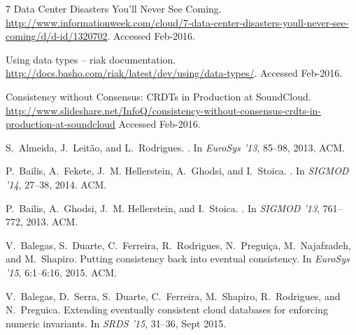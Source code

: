 \documentclass[11pt]{article}
\begin{document}
\begin{thebibliography}{10} 
\itemsep=1pt 
\begin{small}


{7 Data Center Disasters You'll Never See Coming}.
\newblock
  \url{http://www.informationweek.com/cloud/7-data-center-disasters-youll-never-see-coming/d/d-id/1320702}.
\newblock Accessed Feb-2016.

Using data types -- riak documentation.
\newblock \url{http://docs.basho.com/riak/latest/dev/using/data-types/}.
\newblock Accessed Feb-2016.

Consistency without Consensus: CRDTs in Production at SoundCloud.
\newblock  \url{http://www.slideshare.net/InfoQ/consistency-without-consensus-crdts-in-production-at-soundcloud}
\newblock Accessed Feb-2016.

S.~Almeida, J.~Leit\~{a}o, and L.~Rodrigues.
.
  \newblock In {\em EuroSys '13}, 85--98, 2013. ACM.

P.~Bailis, A.~Fekete, J.~M. Hellerstein, A.~Ghodsi, and I.~Stoica.
.
\newblock In {\em SIGMOD '14}, 27--38, 2014. ACM.

P.~Bailis, A.~Ghodsi, J.~M. Hellerstein, and I.~Stoica.
.
\newblock In {\em SIGMOD '13}, 761--772, 2013. ACM.

V.~Balegas, S.~Duarte, C.~Ferreira, R.~Rodrigues, N.~Pregui\c{c}a,
  M.~Najafzadeh, and M.~Shapiro.
\newblock Putting consistency back into eventual consistency.
\newblock In {\em EuroSys '15}, 6:1--6:16, 2015. ACM.

V.~Balegas, D.~Serra, S.~Duarte, C.~Ferreira, M.~Shapiro, R.~Rodrigues, and
  N.~Preguica.
\newblock Extending eventually consistent cloud databases for enforcing numeric
  invariants.
\newblock In {\em SRDS '15}, 31--36, Sept 2015.


\end{small}
\end{thebibliography}
\end{document}
